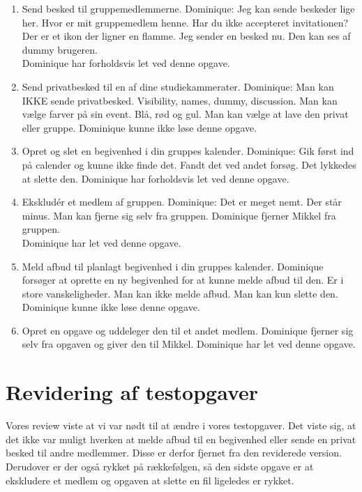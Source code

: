 \documentclass[12pt]{article}
\begin{document}
\begin{enumerate}
\item Send besked til gruppemedlemmerne.
Dominique: Jeg kan sende beskeder lige her. Hvor er mit gruppemedlem henne. Har du ikke accepteret invitationen? Der er et ikon der ligner en flamme. Jeg sender en besked nu. Den kan ses af dummy brugeren.\\
Dominique har forholdsvis let ved denne opgave.

\item Send privatbesked til en af dine studiekammerater.
Dominique: Man kan IKKE sende privatbesked. Visibility, names, dummy, discussion. Man kan vælge farver på sin event. Blå, rød og gul. Man kan vælge at lave den privat eller gruppe.
Dominique kunne ikke løse denne opgave.\\

\item Opret og slet en begivenhed i din gruppes kalender.
Dominique: Gik først ind på calender og kunne ikke finde det. Fandt det ved andet forsøg. Det lykkedes at slette den.
Dominique har forholdsvis let ved denne opgave.\\

\item Ekskludér et medlem af gruppen.
Dominique: Det er meget nemt. Der står minus. Man kan fjerne sig selv fra gruppen. Dominique fjerner Mikkel fra gruppen.\\
Dominique har let ved denne opgave.

\item Meld afbud til planlagt begivenhed i din gruppes kalender.
Dominique forsøger at oprette en ny begivenhed for at kunne melde afbud til den. Er i store vanskeligheder. Man kan ikke melde afbud. Man kan kun slette den.\\
Dominique kunne ikke løse denne opgave.\\

\item Opret en opgave og uddeleger den til et andet medlem.
Dominique fjerner sig selv fra opgaven og giver den til Mikkel.
Dominique har let ved denne opgave.\\

\end{enumerate}


\section{Revidering af testopgaver}

Vores review viste at vi var nødt til at ændre i vores testopgaver. Det viste sig, at  det ikke var muligt hverken at melde afbud til en begivenhed eller sende en privat besked til andre medlemmer. Disse er derfor fjernet fra den reviderede version. Derudover er der også rykket på rækkefølgen, så den sidste opgave er at ekskludere et medlem og opgaven at slette en fil ligeledes er rykket.
\end{document}
